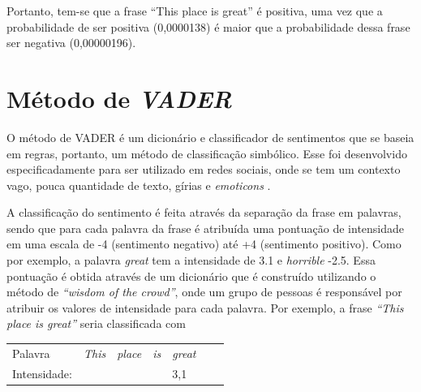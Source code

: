 Portanto, tem-se que a frase ``This place is great'' é positiva, uma vez que a
probabilidade de ser positiva (0,0000138) é maior que a probabilidade dessa
frase ser negativa (0,00000196).

\section{Método de \textit{VADER}}

O método de \ac{VADER} é um dicionário e classificador de sentimentos que se
baseia em regras, portanto, um método de classificação simbólico. Esse foi desenvolvido
especificadamente para ser utilizado em redes sociais, onde se tem um contexto
vago, pouca quantidade de texto, gírias e \textit{emoticons}
\cite{conf/icwsm/HuttoG14}.

A classificação do sentimento é feita através da separação da frase em palavras,
sendo que para cada palavra da frase é atribuída uma pontuação de intensidade em
uma escala de -4 (sentimento negativo) até +4 (sentimento positivo). Como por
exemplo, a palavra \textit{great} tem a intensidade de 3.1 e \textit{horrible} -2.5. Essa pontuação é obtida através de
um dicionário que é construído utilizando o método de \textit{``wisdom of the
crowd''}, onde um grupo de pessoas é responsável por atribuir os valores de
intensidade para cada palavra. Por exemplo, a frase \textit{``This place is great''} seria classificada com


\begin{table}[htb]
\centering
\begin{tabular}{l|l|l|l|l|l|l}
Palavra         & \textit{This}        & \textit{place} & \textit{is}      &
\textit{great}
\\
Intensidade:   &  &   &  & 3,1
\end{tabular}
\label{my-label}
\end{table}

